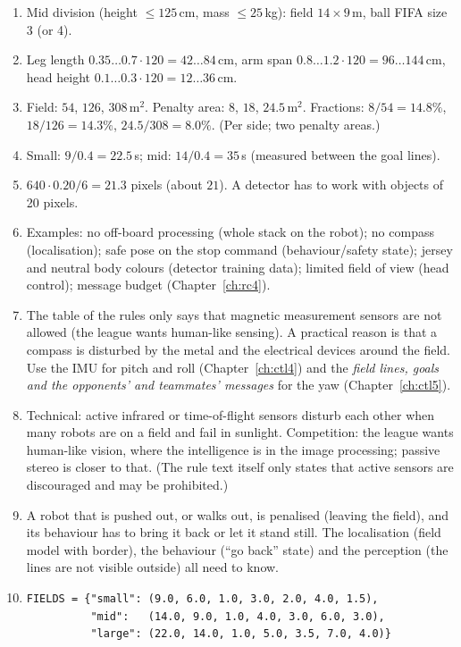 \begin{enumerate}[label=\textbf{\ansnum.\arabic*}]
  \item Mid division (height $\le125$\,cm, mass $\le25$\,kg): field $14\times9$\,m, ball FIFA size 3 (or 4).
  \item Leg length $0.35\ldots0.7\cdot120=42\ldots84$\,cm, arm span $0.8\ldots1.2\cdot120=96\ldots144$\,cm, head height $0.1\ldots0.3\cdot120=12\ldots36$\,cm.
  \item Field: $54$, $126$, $308$\,m$^2$. Penalty area: $8$, $18$, $24.5$\,m$^2$. Fractions: $8/54=14.8\%$, $18/126=14.3\%$, $24.5/308=8.0\%$. (Per side; two penalty areas.)
  \item Small: $9/0.4=22.5$\,s; mid: $14/0.4=35$\,s (measured between the goal lines).
  \item $640\cdot0.20/6=21.3$ pixels (about $21$). A detector has to work with objects of 20 pixels.
  \item Examples: no off-board processing (whole stack on the robot); no compass (localisation); safe pose on the stop command (behaviour/safety state); jersey and neutral body colours (detector training data); limited field of view (head control); message budget (Chapter~\ref{ch:rc4}).
  \item The table of the rules only says that magnetic measurement sensors are not allowed (the league wants human-like sensing). A practical reason is that a compass is disturbed by the metal and the electrical devices around the field. Use the IMU for pitch and roll (Chapter~\ref{ch:ctl4}) and the \emph{field lines, goals and the opponents' and teammates' messages} for the yaw (Chapter~\ref{ch:ctl5}).
  \item Technical: active infrared or time-of-flight sensors disturb each other when many robots are on a field and fail in sunlight. Competition: the league wants human-like vision, where the intelligence is in the image processing; passive stereo is closer to that. (The rule text itself only states that active sensors are discouraged and may be prohibited.)
  \item A robot that is pushed out, or walks out, is penalised (leaving the field), and its behaviour has to bring it back or let it stand still. The localisation (field model with border), the behaviour (``go back'' state) and the perception (the lines are not visible outside) all need to know.
  \item
\begin{verbatim}
FIELDS = {"small": (9.0, 6.0, 1.0, 3.0, 2.0, 4.0, 1.5),
          "mid":   (14.0, 9.0, 1.0, 4.0, 3.0, 6.0, 3.0),
          "large": (22.0, 14.0, 1.0, 5.0, 3.5, 7.0, 4.0)}


\end{verbatim}
\end{enumerate}
